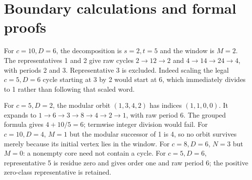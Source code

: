 \documentclass[11pt,letterpaper]{article}
\begin{document}
\section{Boundary calculations and formal proofs}

For $c=10,D=6$, the decomposition is $s=2,t=5$ and the window is $M=2$.
The representatives 1 and 2 give raw cycles $2\to12\to2$ and
$4\to14\to24\to4$, with periods 2 and 3. Representative 3 is excluded.
Indeed scaling the legal $c=5,D=6$ cycle starting at 3 by 2 would start at 6,
which immediately divides to 1 rather than following that scaled word.

For $c=5,D=2$, the modular orbit $(1,3,4,2)$ has indices $(1,1,0,0)$.
It expands to $1\to6\to3\to8\to4\to2\to1$, with raw period 6.
The grouped formula gives $4+10/5=6$; termwise integer division would fail.
For $c=10,D=4$, $M=1$ but the modular successor of 1 is 4, so no orbit
survives merely because its initial vertex lies in the window.
For $c=8,D=6$, $N=3$ but $M=0$: a nonempty core need not contain a cycle.
For $c=5,D=6$, representative 5 is residue zero and gives order one and
raw period 6; the positive zero-class representative is retained.
\end{document}
